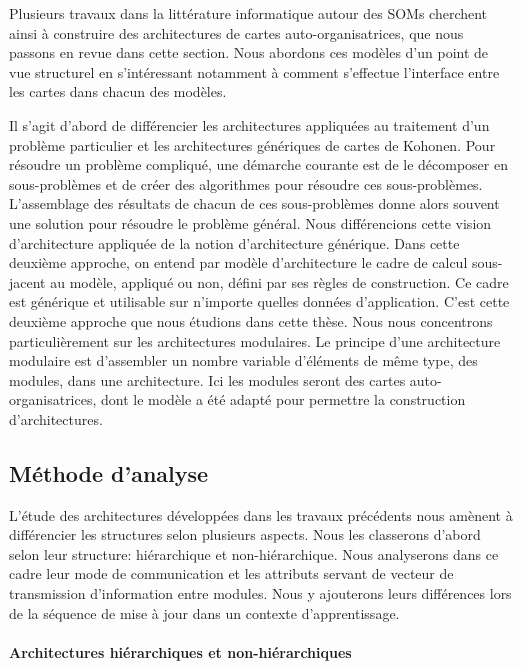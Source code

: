 \documentclass[../main]{subfiles}
\begin{document}
Plusieurs travaux dans la littérature informatique autour des SOMs cherchent ainsi à construire des architectures de cartes auto-organisatrices, que nous passons en revue dans cette section.
Nous abordons ces modèles d'un point de vue structurel en s'intéressant notamment à comment s'effectue l'interface entre les cartes dans chacun des modèles.

Il s'agit d'abord de différencier les architectures appliquées au traitement d'un problème particulier et les architectures génériques de cartes de Kohonen.
Pour résoudre un problème compliqué, une démarche courante est de le décomposer en sous-problèmes et de créer des algorithmes pour résoudre ces sous-problèmes. L'assemblage des résultats de chacun de ces sous-problèmes donne alors souvent une solution pour résoudre le problème général.
Nous différencions cette vision d'architecture appliquée de la notion d'architecture générique. 
Dans cette deuxième approche, on entend par modèle d'architecture le cadre de calcul sous-jacent au modèle, appliqué ou non, défini par ses règles de construction. Ce cadre est générique et utilisable sur n'importe quelles données d'application. C'est cette deuxième approche que nous étudions dans cette thèse. Nous nous concentrons particulièrement sur les architectures modulaires.
Le principe d'une architecture modulaire est d'assembler un nombre variable d'éléments de même type, des modules, dans une architecture. Ici les modules seront des cartes auto-organisatrices, dont le modèle a été adapté pour permettre la construction d'architectures.

\subsection{Méthode d'analyse}

L'étude des architectures développées dans les travaux précédents nous amènent à différencier les structures selon plusieurs aspects. Nous les classerons d'abord selon leur structure: hiérarchique et non-hiérarchique.
Nous analyserons dans ce cadre leur mode de communication et les attributs servant de vecteur de transmission d'information entre modules. Nous y ajouterons leurs différences lors de la séquence de mise à jour dans un contexte d'apprentissage.

\paragraph{Architectures hiérarchiques et non-hiérarchiques}
\end{document}
